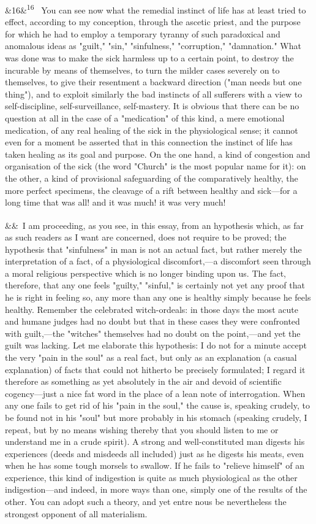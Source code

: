 \documentclass[12pt]{article}
\newcommand{\para}[1][]{\par\noindent\ifx&#1&\else\textsuperscript{\footnotesize #1}~\fi}
\begin{document}
\para[16] You can see now what the remedial instinct of life has at least tried to effect, according to my conception, through the ascetic priest, and the purpose for which he had to employ a temporary tyranny of such paradoxical and anomalous ideas as "guilt," "sin," "sinfulness," "corruption," "damnation." What was done was to make the sick harmless up to a certain point, to destroy the incurable by means of themselves, to turn the milder cases severely on to themselves, to give their resentment a backward direction ("man needs but one thing"), and to exploit similarly the bad instincts of all sufferers with a view to self-discipline, self-surveillance, self-mastery. It is obvious that there can be no question at all in the case of a "medication" of this kind, a mere emotional medication, of any real healing of the sick in the physiological sense; it cannot even for a moment be asserted that in this connection the instinct of life has taken healing as its goal and purpose. On the one hand, a kind of congestion and organisation of the sick (the word "Church" is the most popular name for it): on the other, a kind of provisional safeguarding of the comparatively healthy, the more perfect specimens, the cleavage of a rift between healthy and sick---for a long time that was all! and it was much! it was very much!

\para I am proceeding, as you see, in this essay, from an hypothesis which, as far as such readers as I want are concerned, does not require to be proved; the hypothesis that "sinfulness" in man is not an actual fact, but rather merely the interpretation of a fact, of a physiological discomfort,---a discomfort seen through a moral religious perspective which is no longer binding upon us. The fact, therefore, that any one feels "guilty," "sinful," is certainly not yet any proof that he is right in feeling so, any more than any one is healthy simply because he feels healthy. Remember the celebrated witch-ordeals: in those days the most acute and humane judges had no doubt but that in these cases they were confronted with guilt,---the "witches" themselves had no doubt on the point,---and yet the guilt was lacking. Let me elaborate this hypothesis: I do not for a minute accept the very "pain in the soul" as a real fact, but only as an explanation (a casual explanation) of facts that could not hitherto be precisely formulated; I regard it therefore as something as yet absolutely in the air and devoid of scientific cogency---just a nice fat word in the place of a lean note of interrogation. When any one fails to get rid of his "pain in the soul," the cause is, speaking crudely, to be found not in his "soul" but more probably in his stomach (speaking crudely, I repeat, but by no means wishing thereby that you should listen to me or understand me in a crude spirit). A strong and well-constituted man digests his experiences (deeds and misdeeds all included) just as he digests his meats, even when he has some tough morsels to swallow. If he fails to "relieve himself" of an experience, this kind of indigestion is quite as much physiological as the other indigestion---and indeed, in more ways than one, simply one of the results of the other. You can adopt such a theory, and yet entre nous be nevertheless the strongest opponent of all materialism.
\end{document}
